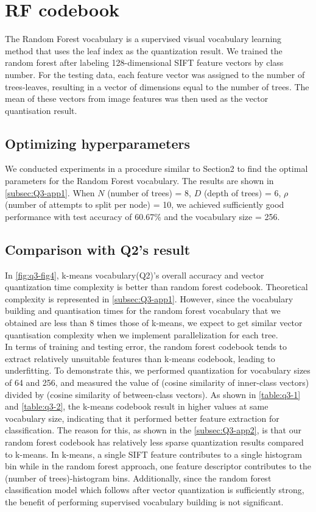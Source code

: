 \section{RF codebook}
\label{sec:intro_q3}
The Random Forest vocabulary is a supervised visual vocabulary learning method that uses the leaf index as the quantization result. We trained the random forest after labeling 128-dimensional SIFT feature vectors by class number. For the testing data, each feature vector was assigned to the number of trees-leaves, resulting in a vector of dimensions equal to the number of trees. The mean of these vectors from image features was then used as the vector quantisation result.

\subsection{Optimizing hyperparameters}
We conducted experiments in a procedure similar to Section2 to find the optimal parameters for the Random Forest vocabulary. The results are shown in \cref{subsec:Q3-app1}. When $N$ (number of trees) = 8, $D$ (depth of trees) = 6, $\rho$ (number of attempts to split per node) = 10, we achieved sufficiently good performance with test accuracy of 60.67\% and the vocabulary size = 256.

\subsection{Comparison with Q2's result}
In \cref{fig:q3-fig4}, k-means vocabulary(Q2)'s overall accuracy and vector quantization time complexity is better than random forest codebook. Theoretical complexity is represented in \cref{subsec:Q3-app1}. However, since the vocabulary building and quantisation times for the random forest vocabulary that we obtained are less than 8 times those of k-means, we expect to get similar vector quantisation complexity when we implement parallelization for each tree.\\
In terms of training and testing error, the random forest codebook tends to extract relatively unsuitable features than k-means codebook, leading to underfitting. To demonstrate this, we performed quantization for vocabulary sizes of 64 and 256, and measured the value of (cosine similarity of inner-class vectors) divided by (cosine similarity of between-class vectors). As shown in \cref{table:q3-1} and \cref{table:q3-2}, the k-means codebook result in higher values at same vocabulary size, indicating that it performed better feature extraction for classification. The reason for this, as shown in the \cref{subsec:Q3-app2}, is that our random forest codebook has relatively less sparse quantization results compared to k-means. In k-means, a single SIFT feature contributes to a single histogram bin while in the random forest approach, one feature descriptor contributes to the (number of trees)-histogram bins. Additionally, since the random forest classification model which follows after vector quantization is sufficiently strong, the benefit of performing supervised vocabulary building is not significant.

